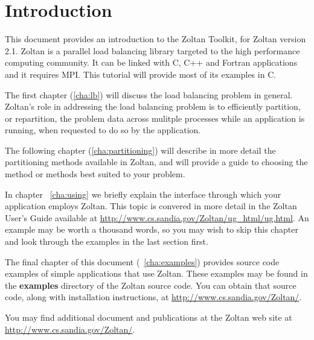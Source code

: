 %
% 
%
\chapter{Introduction}

This document provides an introduction to the Zoltan Toolkit,
for Zoltan version 2.1.  Zoltan is a parallel load balancing library
targeted to the high performance computing community.  It can be
linked with C, C++ and Fortran applications and it requires MPI.  
This tutorial will provide most of its examples in C.

The first chapter (\ref{cha:lb})
will discuss the load balancing problem in general.
Zoltan's role in addressing the load balancing problem is to 
efficiently partition,
or repartition, the problem data across mulitple processes while an
application is running, when requested to do so by the application.

The following chapter (\ref{cha:partitioning})
will describe in more detail the partitioning
methods available in Zoltan, and will provide a guide
to choosing the method or methods best suited to your problem.

In chapter ~\ref{cha:using} we briefly explain the interface
through which your application employs Zoltan.  This topic is
convered in more detail in the
Zoltan User's Guide available at
\url{http://www.cs.sandia.gov/Zoltan/ug_html/ug.html}.
An example may be worth a thousand words, so you may wish to 
skip this chapter and look through the examples in the last section first.

The final chapter of this document (~\ref{cha:examples}) provides
source code examples of simple applications that use Zoltan.
These examples may be found in the \textbf{examples} directory
of the Zoltan source code.  You can obtain that source code,
along with installation instructions, at
\url{http://www.cs.sandia.gov/Zoltan/}.

You may find additional document and publications at the
Zoltan web site at
\url{http://www.cs.sandia.gov/Zoltan/}.

